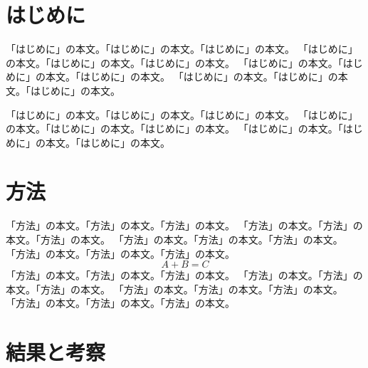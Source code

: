 \documentclass[a4j,10pt]{jarticle}
\begin{document}

\section{はじめに}

「はじめに」の本文。「はじめに」の本文。「はじめに」の本文。
「はじめに」の本文。「はじめに」の本文。「はじめに」の本文。
「はじめに」の本文。「はじめに」の本文。「はじめに」の本文。
「はじめに」の本文。「はじめに」の本文。「はじめに」の本文。

「はじめに」の本文。「はじめに」の本文。「はじめに」の本文。
「はじめに」の本文。「はじめに」の本文。「はじめに」の本文。
「はじめに」の本文。「はじめに」の本文。「はじめに」の本文。
\cite{1stPaper}

\section{方法}

「方法」の本文。「方法」の本文。「方法」の本文。
「方法」の本文。「方法」の本文。「方法」の本文。
「方法」の本文。「方法」の本文。「方法」の本文。
「方法」の本文。「方法」の本文。「方法」の本文。
\begin{equation}
A+B=C
\end{equation}
「方法」の本文。「方法」の本文。「方法」の本文。
「方法」の本文。「方法」の本文。「方法」の本文。
「方法」の本文。「方法」の本文。「方法」の本文。
「方法」の本文。「方法」の本文。「方法」の本文。
\cite{1stPaper,2ndPaper}

\section{結果と考察}
\end{document}
